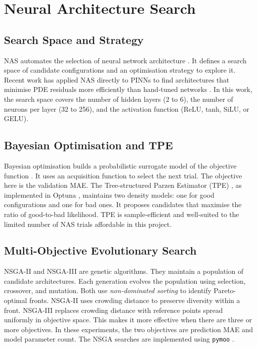 \section{Neural Architecture Search}
\label{sec:nas_theory}

\subsection{Search Space and Strategy}

NAS automates the selection of neural network architecture \cite{zoph2018,liu2019darts}.
It defines a search space of candidate configurations and an optimisation
strategy to explore it.
Recent work has applied NAS directly to PINNs to find architectures that
minimise PDE residuals more efficiently than hand-tuned networks
\cite{wang2023,wang2025nasv2}.
In this work, the search space covers the number of hidden layers
(2 to 6), the number of neurons per layer (32 to 256), and
the activation function (ReLU, tanh, SiLU, or GELU).

\subsection{Bayesian Optimisation and TPE}

Bayesian optimisation builds a probabilistic surrogate model of the objective
function \cite{bergstra2011,snoek2012}.
It uses an acquisition function to select the next trial.
The objective here is the validation MAE.
The Tree-structured Parzen Estimator (TPE) \cite{bergstra2011}, as implemented
in Optuna \cite{akiba2019}, maintains two density models: one for good
configurations and one for bad ones.
It proposes candidates that maximise the ratio of good-to-bad likelihood.
TPE is sample-efficient and well-suited to the limited number of NAS trials
affordable in this project.

\subsection{Multi-Objective Evolutionary Search}

NSGA-II \cite{deb2002} and NSGA-III \cite{deb2014} are genetic algorithms.
They maintain a population of candidate architectures.
Each generation evolves the population using selection, crossover, and
mutation.
Both use \emph{non-dominated sorting} to identify Pareto-optimal fronts.
NSGA-II uses crowding distance to preserve diversity within a front.
NSGA-III replaces crowding distance with reference points spread uniformly
in objective space.
This makes it more effective when there are three or more objectives.
In these experiments, the two objectives are prediction MAE and model
parameter count.
The NSGA searches are implemented using \texttt{pymoo} \cite{blank2020pymoo}.

